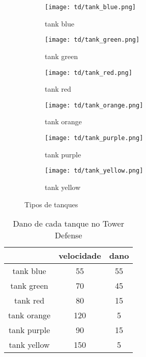 \begin{figure}
     \centering
     \begin{subfigure}[b]{0.2\textwidth}
         \centering
         \texttt{[image: td/tank\_blue.png]}
         \caption{tank blue}
         \label{fig:td-tank-blue}
     \end{subfigure}
     \hfill
     \begin{subfigure}[b]{0.2\textwidth}
         \centering
         \texttt{[image: td/tank\_green.png]}
         \caption{tank green}
         \label{fig:td-tank-green}
     \end{subfigure}
     \hfill
     \begin{subfigure}[b]{0.2\textwidth}
         \centering
         \texttt{[image: td/tank\_red.png]}
         \caption{tank red}
         \label{fig:td-tank-red}
     \end{subfigure}
     
     \begin{subfigure}[b]{0.2\textwidth}
         \centering
         \texttt{[image: td/tank\_orange.png]}
         \caption{tank orange}
         \label{fig:td-tank-orange}
     \end{subfigure}
     \hfill
     \begin{subfigure}[b]{0.2\textwidth}
         \centering
         \texttt{[image: td/tank\_purple.png]}
         \caption{tank purple}
         \label{fig:td-tank-purple}
     \end{subfigure}
     \hfill
     \begin{subfigure}[b]{0.2\textwidth}
         \centering
         \texttt{[image: td/tank\_yellow.png]}
         \caption{tank yellow}
         \label{fig:td-tank-yellow}
     \end{subfigure}     
     \caption{Tipos de tanques}
     \label{fig:figure-tipos-tanque}
\end{figure}

\newpage

\begin{table}
\caption{Dano de cada tanque no Tower Defense}
\begin{tabular}{c|cc}
            & velocidade & dano   \\ \hline
tank blue   & 55    & 55         \\
tank green  & 70    & 45         \\
tank red    & 80    & 15          \\
tank orange & 120   & 5           \\
tank purple & 90    & 15          \\
tank yellow & 150   & 5           
\end{tabular}
\label{tab:tank-dmg}
\end{table}

